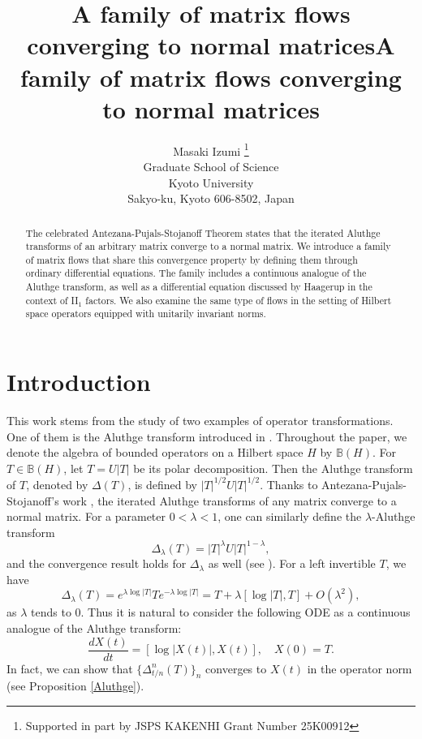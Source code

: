 \documentclass[12pt]{article}
\title{A family of matrix flows converging to normal matrices}
\title{A family of matrix flows converging to normal matrices}
\author{Masaki Izumi
	\thanks{Supported in part by JSPS KAKENHI Grant Number 25K00912}\\
	Graduate School of Science \\
	Kyoto University \\
	Sakyo-ku, Kyoto 606-8502, Japan \\
	\email{izumi@math.kyoto-u.ac.jp}}
\theoremstyle{definition}
\numberwithin{equation}{section}
\newcommand{\B}{\mathbb{B}}
\begin{document}
 
\maketitle
\begin{abstract} 
The celebrated Antezana-Pujals-Stojanoff Theorem states that the iterated Aluthge transforms of 
an arbitrary matrix converge to a normal matrix.
We introduce a family of matrix flows that share this convergence property 
by defining them through ordinary differential equations. 
The family includes a continuous analogue of the Aluthge transform, 
as well as a differential equation discussed by Haagerup in the context of II$_1$ factors. 
We also examine the same type of flows in the setting of Hilbert space operators equipped with unitarily invariant norms. 
\end{abstract}


\section{Introduction} 
This work stems from the study of two examples of operator transformations. 
One of them is the Aluthge transform introduced in \cite{A1990}.  
Throughout the paper, we denote the algebra of bounded operators on a Hilbert space $H$ by $\B(H)$. 
For $T\in \B(H)$, let $T=U|T|$ be its polar decomposition. 
Then the Aluthge transform of $T$, denoted by $\Delta(T)$, is defined by $|T|^{1/2}U|T|^{1/2}$.  
Thanks to Antezana-Pujals-Stojanoff's work \cite[Theorem 4.12]{APS2011}, 
the iterated Aluthge transforms of any matrix converge to a normal matrix. 
For a parameter $0<\lambda<1$, one can similarly define the $\lambda$-Aluthge transform
\[\Delta_\lambda(T)=|T|^\lambda U|T|^{1-\lambda},\] 
and the convergence result holds for $\Delta_\lambda$ as well (see \cite[Theorem 6.1]{APS2011}). 
For a left invertible $T$, we have 
\begin{equation*}
\Delta_\lambda(T)=e^{\lambda \log |T|}Te^{-\lambda \log |T|}=T+\lambda [\log |T|,T]+O(\lambda^2),
\end{equation*}
as $\lambda$ tends to 0. 
Thus it is natural to consider the following ODE as a continuous analogue of the Aluthge transform: 
\begin{equation}\label{cAluthge}
	\frac{dX(t)}{dt}=[\log |X(t)|,X(t)],\quad X(0)=T.
\end{equation}
In fact, we can show that $\{\Delta_{t/n}^n(T)\}_{n}$ converges to $X(t)$ in the operator norm 
(see Proposition \ref{Aluthge}). 
\end{document}
